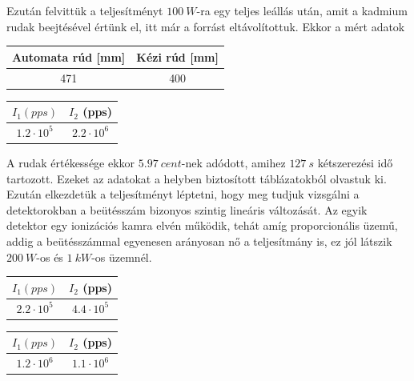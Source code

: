 \documentclass[a4paper,12pt]{article}
\begin{document}
\par Ezután felvittük a teljesítményt $100~W$-ra egy teljes leállás után, amit a kadmium rudak beejtésével értünk el, itt már a forrást eltávolítottuk. Ekkor a mért adatok

\begin{center}
\begin{tabular}{|c|c|} \hline
Automata rúd [mm] & Kézi rúd [mm] \\ \hline
471 & 400 \\ \hline
\end{tabular}
\end{center}

\vspace{.1cm}

\begin{center}
\begin{tabular}{|c|c|} \hline
$I_{1} (pps)$ & $I_{2}$ (pps) \\ \hline
$1.2 \cdot 10^{5}$ & $2.2 \cdot 10^{6}$ \\ \hline
\end{tabular}
\end{center}

\par A rudak értékessége ekkor $5.97~cent$-nek adódott, amihez $127~s$ kétszerezési idő tartozott. Ezeket az adatokat a helyben biztosított táblázatokból olvastuk ki. Ezután elkezdetük a teljesítményt léptetni, hogy meg tudjuk vizsgálni a detektorokban a beütésszám bizonyos szintig lineáris változását. Az egyik detektor egy ionizációs kamra elvén működik, tehát amíg proporcionális üzemű, addig a beütésszámmal egyenesen arányosan nő a teljesítmány is, ez jól látszik $200~W$-os és $1~kW$-os üzemnél.

\begin{center}
\begin{tabular}{|c|c|} \hline
$I_{1} (pps)$ & $I_{2}$ (pps) \\ \hline
$2.2 \cdot 10^{5}$ & $4.4 \cdot 10^{5}$ \\ \hline
\end{tabular}
\end{center}

\vspace{.1cm}

\begin{center}
\begin{tabular}{|c|c|} \hline
$I_{1} (pps)$ & $I_{2}$ (pps) \\ \hline
$1.2 \cdot 10^{6}$ & $1.1 \cdot 10^{6}$ \\ \hline
\end{tabular}
\end{center}
\end{document}
